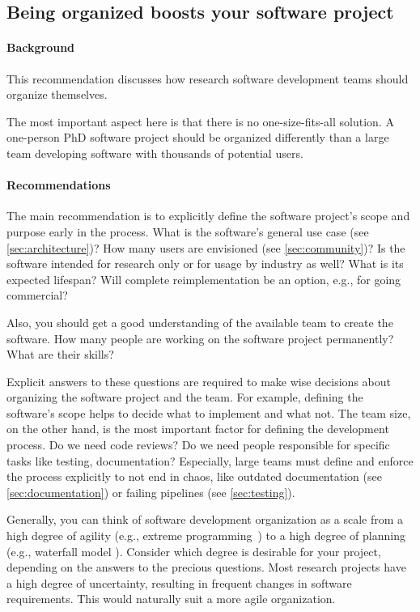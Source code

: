 \subsection{Being organized boosts your software project}
\label{sec:workProcess}

\paragraph{Background} This recommendation discusses how research software development teams should organize themselves.

The most important aspect here is that there is no one-size-fits-all solution.
A one-person PhD software project should be organized differently than a large team developing software with thousands of potential users.

\paragraph{Recommendations} The main recommendation is to explicitly define the software project's scope and purpose early in the process. What is the software's general use case (see \ref{sec:architecture})? How many users are envisioned (see \ref{sec:community})? 
Is the software intended for research only or for usage by industry as well? What is its expected lifespan? Will complete reimplementation be an option, e.g., for going commercial?

Also, you should get a good understanding of the available team to create the software. 
How many people are working on the software project permanently? What are their skills? 

Explicit answers to these questions are required to make wise decisions about organizing the software project and the team. 
For example, defining the software's scope helps to decide what to implement and what not. 
The team size, on the other hand, is the most important factor for defining the development process. Do we need code reviews? Do we need people responsible for specific tasks like testing, documentation? Especially, large teams must define and enforce the process explicitly to not end in chaos, like outdated documentation (see \ref{sec:documentation}) or failing pipelines (see \ref{sec:testing}).

Generally, you can think of software development organization as a scale from a high degree of agility (e.g., extreme programming~\cite{796139}) to a high degree of planning (e.g., waterfall model \cite{Petersen835760}). Consider which degree is desirable for your project, depending on the answers to the precious questions. Most research projects have a high degree of uncertainty, resulting in frequent changes in software requirements. This would naturally suit a more agile organization.

